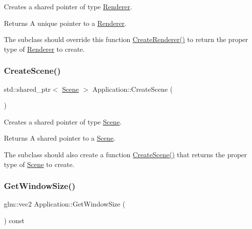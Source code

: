 Creates a shared pointer of type \hyperlink{class_renderer}{Renderer}.

\begin{DoxyReturn}{Returns}
A unique pointer to a \hyperlink{class_renderer}{Renderer}.
\end{DoxyReturn}
The subclass should override this function \hyperlink{class_application_a90c7fd9ecb6c8923948078903d442919}{Create\+Renderer()} to return the proper type of \hyperlink{class_renderer}{Renderer} to create. \hypertarget{class_application_a511e638cf5748e10151f17d6140b9119}{}\label{class_application_a511e638cf5748e10151f17d6140b9119}
\subsubsection{\texorpdfstring{Create\+Scene()}{CreateScene()}}
{\footnotesize\ttfamily std\+::shared\+\_\+ptr$<$ \hyperlink{class_scene}{Scene} $>$ Application\+::\+Create\+Scene (\begin{DoxyParamCaption}{ }\end{DoxyParamCaption})\hspace{0.3cm}{\ttfamily [static]}}



Creates a shared pointer of type \hyperlink{class_scene}{Scene}.

\begin{DoxyReturn}{Returns}
A shared pointer to a \hyperlink{class_scene}{Scene}.
\end{DoxyReturn}
The subclass should also create a function \hyperlink{class_application_a511e638cf5748e10151f17d6140b9119}{Create\+Scene()} that returns the proper type of \hyperlink{class_scene}{Scene} to create. \hypertarget{class_application_ab190ae0e987fe95682714dd4b2495e82}{}\label{class_application_ab190ae0e987fe95682714dd4b2495e82}
\subsubsection{\texorpdfstring{Get\+Window\+Size()}{GetWindowSize()}}
{\footnotesize\ttfamily glm\+::vec2 Application\+::\+Get\+Window\+Size (\begin{DoxyParamCaption}{ }\end{DoxyParamCaption}) const\hspace{0.3cm}{\ttfamily [virtual]}}



